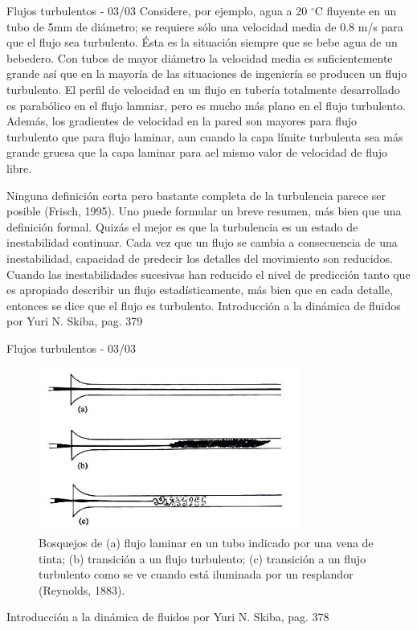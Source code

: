 \begin{frame}{Flujos turbulentos - 03/03}
\justifying
Considere, por ejemplo, agua a 20  $^{\circ}$C fluyente en un tubo de 5mm de diámetro; se requiere sólo una velocidad media de 0.8 m/s para que el flujo sea turbulento. Ésta es la situación siempre que se bebe agua de un bebedero. Con tubos de mayor diámetro la velocidad media es suficientemente grande así que en la mayoría de las situaciones de ingeniería se producen un flujo turbulento. El perfil de velocidad en un flujo en tubería totalmente desarrollado es parabólico en el flujo lamniar, pero es mucho más plano en el flujo turbulento. Además, los gradientes de velocidad en la pared son mayores para flujo turbulento que para flujo laminar, aun cuando la capa límite turbulenta sea más grande gruesa que la capa laminar para ael mismo valor de velocidad de flujo libre.

Ninguna definición corta pero bastante completa de la turbulencia parece ser posible (Frisch, 1995). Uno puede formular un breve resumen, más bien que una definición formal. Quizás el mejor es que la turbulencia es un estado de inestabilidad continuar. Cada vez que un flujo se cambia a consecuencia de una inestabilidad, capacidad de predecir los detalles del movimiento son reducidos. Cuando las inestabilidades sucesivas han reducido el nivel de predicción tanto que es apropiado describir un flujo estadísticamente, más bien que en cada detalle, entonces se dice que el flujo es turbulento.
{\tiny Introducción a la dinámica de fluidos por Yuri N. Skiba, pag. 379}
\end{frame}

\begin{frame}{Flujos turbulentos - 03/03}
\justifying
\begin{figure}[H]
\centering
\includegraphics[scale=0.4]{Section_Files/S2-imagenes-Jhon/Book-IMF/01.png}
\caption{Bosquejos de (a) flujo laminar en un tubo indicado por una vena de tinta;
(b) transición a un flujo turbulento; (c) transición a un flujo turbulento como se ve cuando está iluminada por un resplandor (Reynolds, 1883).}
\end{figure}
{\tiny Introducción a la dinámica de fluidos por Yuri N. Skiba, pag. 378}
\end{frame}

